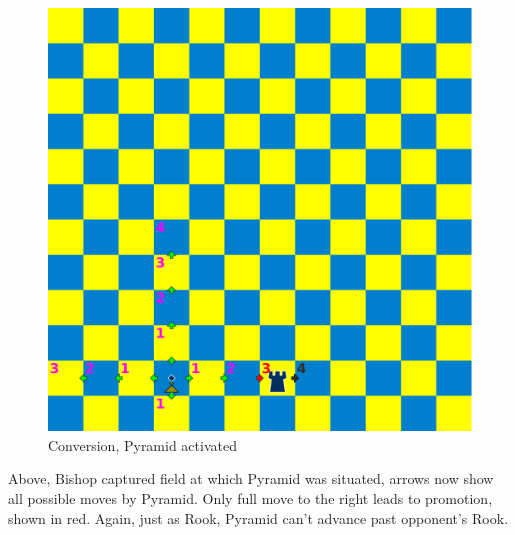 \documentclass[a5paper,12pt,draft]{book} %
\begin{document}
\noindent
\begin{figure}[!h]
\includegraphics[width=1.0\textwidth, keepaspectratio=true]{../gfx/examples/08_move_pyramid_conversion_activated.png}
\caption{Conversion, Pyramid activated}
\label{fig:ma_conversion_activated}
\end{figure}

Above, Bishop captured field at which Pyramid was situated, arrows now show
all possible moves by Pyramid. Only full move to the right leads to promotion,
shown in red. Again, just as Rook, Pyramid can't advance past opponent's Rook.

\clearpage
\end{document}
